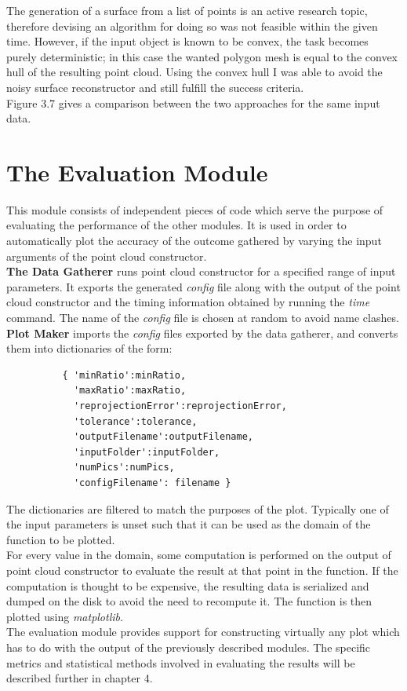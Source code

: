 \documentclass[12pt,a4paper,twoside,openright]{report}
\begin{document}


The generation of a surface from a list of points is an active research topic, therefore devising an algorithm for doing so was not feasible within the given time. However, if the input object is known to be convex, the task becomes purely deterministic; in this case the wanted polygon mesh is equal to the convex hull of the resulting point cloud. Using the convex hull I was able to avoid the noisy surface reconstructor and still fulfill the success criteria.\\
\linebreak
Figure 3.7 gives a comparison between the two approaches for the same input data.

\section{The Evaluation Module}
This module consists of independent pieces of code which serve the purpose of evaluating the performance of the other modules. It is used in order to automatically plot the accuracy of the outcome gathered by varying the input arguments of the point cloud constructor.\\
\linebreak
\textbf{The Data Gatherer} runs point cloud constructor for a specified range of input parameters. It exports the generated \emph{config} file along with the output of the point cloud constructor and the timing information obtained by running the \emph{time} command. The name of the \emph{config} file is chosen at random to avoid name clashes.\\
\linebreak
\textbf{Plot Maker} imports the \emph{config} files exported by the data gatherer, and converts them into dictionaries of the form: \begin{verbatim}    
          { 'minRatio':minRatio,
            'maxRatio':maxRatio,
            'reprojectionError':reprojectionError,
            'tolerance':tolerance,
            'outputFilename':outputFilename,
            'inputFolder':inputFolder,
            'numPics':numPics,
            'configFilename': filename }
\end{verbatim}
The dictionaries are filtered to match the purposes of the plot. Typically one of the input parameters is unset such that it can be used as the domain of the function to be plotted.\\
For every value in the domain, some computation is performed on the output of point cloud constructor to evaluate the result at that point in the function. If the computation is thought to be expensive, the resulting data is serialized and dumped on the disk to avoid the need to recompute it. The function is then plotted using \emph{matplotlib}.\\
\linebreak
The evaluation module provides support for constructing virtually any plot which has to do with the output of the previously described modules. The specific metrics and statistical methods involved in evaluating the results will be described further in chapter 4. 
\end{document}
